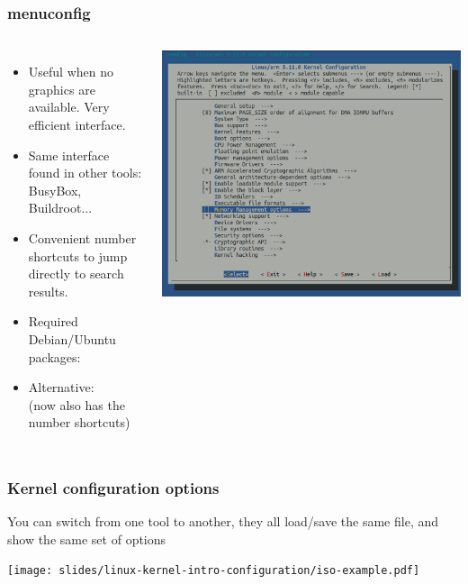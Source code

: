 \begin{frame}
  \frametitle{menuconfig}
  \begin{columns}
    \begin{itemize}
      \item Useful when no graphics are available. Very efficient interface.
      \item Same interface found in other tools: BusyBox, Buildroot...
      \item Convenient number shortcuts to jump directly to search results.
      \item Required Debian/Ubuntu packages: 
      \item Alternative: \\
            (now also has the number shortcuts)
    \end{itemize}
    \includegraphics[width=\textwidth]{slides/linux-kernel-intro-configuration/menuconfig-screenshot.png}
  \end{columns}
\end{frame}

\begin{frame}
  \frametitle{Kernel configuration options}
  You can switch from one tool to another, they all load/save the same
   file, and show the same set of options
  \begin{center}
    \texttt{[image: slides/linux-kernel-intro-configuration/iso-example.pdf]}
  \end{center}
\end{frame}

